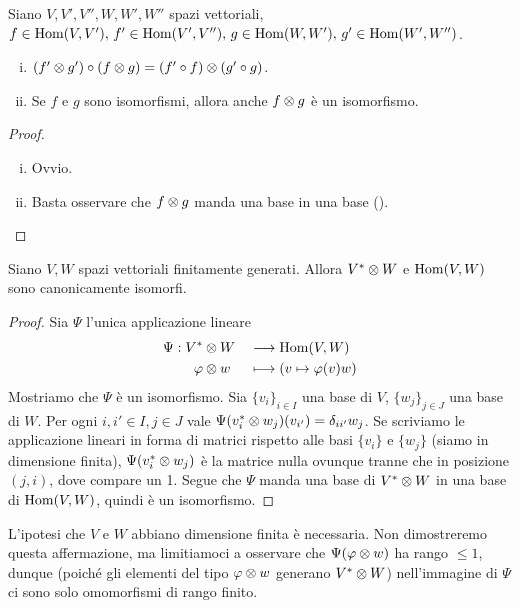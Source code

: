 \begin{proposition}
Siano $V\comma V'\comma V''\comma W\comma W'\comma W''$ spazi vettoriali, $f\in\operatorname{Hom}(V,V'),\,\allowbreak f'\in\operatorname{Hom}(V',V''),\,\allowbreak g\in\operatorname{Hom}(W,W'),\,\allowbreak g'\in\operatorname{Hom}(W',W'')$.
\begin{enumerate}[(i)]
\item $(f'\otimes g')\circ(f\otimes g)=(f'\circ f)\otimes(g'\circ g)$.
\item Se $f$ e $g$ sono isomorfismi, allora anche $f\otimes g$ è un isomorfismo.
\end{enumerate}
\end{proposition}
\begin{proof}\leavevmode
\begin{enumerate}[(i)]
\item Ovvio.
\item Basta osservare che $f\otimes g$ manda una base in una base ().
\end{enumerate}
\end{proof}

\begin{proposition}
Siano $V\comma W$ spazi vettoriali finitamente generati. Allora $V^*\otimes W$ e $\operatorname{Hom}(V,W)$ sono canonicamente isomorfi.
\end{proposition}
\begin{proof}
Sia $\Psi$ l'unica applicazione lineare
\begin{alignat*}{2}
\Psi:V^*&\otimes W&&\longrightarrow\operatorname{Hom}(V,W)\\
\varphi&\otimes w&&\longmapsto(v\mapsto \varphi(v)w)
\end{alignat*}
Mostriamo che $\Psi$ è un isomorfismo. Sia $\{v_i\}_{i\in I}$ una base di $V$, $\{w_j\}_{j\in J}$ una base di $W$. Per ogni $i,i'\in I\comma j\in J$ vale $\Psi(v_i^*\otimes w_j)(v_{i'})=\delta_{ii'}w_j$. Se scriviamo le applicazione lineari in forma di matrici rispetto alle basi $\{v_i\}$ e $\{w_j\}$ (siamo in dimensione finita), $\Psi(v_i^*\otimes w_j)$ è la matrice nulla ovunque tranne che in posizione $(j,i)$, dove compare un 1. Segue che $\Psi$ manda una base di $V^*\otimes W$ in una base di $\operatorname{Hom}(V,W)$, quindi è un isomorfismo.
\end{proof}

\begin{remark}
L'ipotesi che $V$ e $W$ abbiano dimensione finita è necessaria. Non dimostreremo questa affermazione, ma limitiamoci a osservare che $\Psi(\varphi\otimes w)$ ha rango $\le 1$, dunque (poiché gli elementi del tipo $\varphi\otimes w$ generano $V^*\otimes W$) nell'immagine di $\Psi$ ci sono solo omomorfismi di rango finito.
\end{remark}

